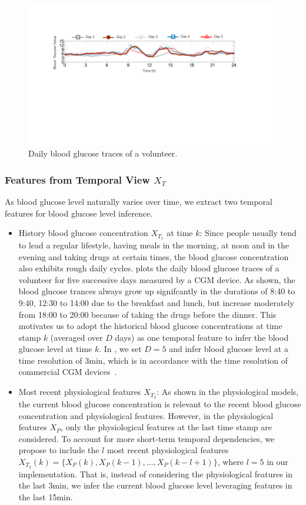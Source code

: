 \begin{figure}[t]
  \centering
  \includegraphics[width=0.8\columnwidth]{./img/historical_trend1.pdf}
  \caption{ Daily blood glucose traces of a volunteer.}
  \label{fig:historical_traces}
\end{figure}


\subsubsection{Features from Temporal View $X_T$}
As blood glucose level naturally varies over time, we extract two temporal features for blood glucose level inference.
\begin{itemize}
  \item
  History blood glucose concentration $X_{T_1}$ at time $k$:
  Since people usually tend to lead a regular lifestyle, \eg having meals in the morning, at noon and in the evening and taking drugs at certain times, the blood glucose concentration also exhibits rough daily cycles.
   plots the daily blood glucose traces of a volunteer for five successive days measured by a CGM device. \textcolor[rgb]{1.00,0.00,0.00}{As shown, the blood glucose trances always grow up signifcantly
  in the durations of 8:40 to 9:40, 12:30 to 14:00 due to the breakfast and lunch, but increase moderately from 18:00 to 20:00 because of taking the drugs before the dinner.}
  This motivates us to adopt the historical blood glucose concentrations at time stamp $k$ (averaged over $D$ days) as one temporal feature to infer the blood glucose level at time $k$.
  In \sysname, we set $D=5$ and infer blood glucose level at a time resolution of 3min, which is in accordance with the time resolution of commercial CGM devices~\cite{bib:CGM_wave}.
  \item
  Most recent physiological features $X_{T_2}$:
  As shown in the physiological models, the current blood glucose concentration is relevant to the recent blood glucose concentration and physiological features.
  However, in the physiological features $X_P$, only the physiological features at the last time stamp are considered.
  To account for more short-term temporal dependencies, we propose to include the $l$ most recent physiological features $X_{T_2}(k) = \{X_P(k), X_P(k-1), \ldots, X_P(k-l+1)\}$, where $l=5$ in our implementation.
  That is, instead of considering the physiological features in the last 3min, we infer the current blood glucose level leveraging features in the last 15min.
\end{itemize}

